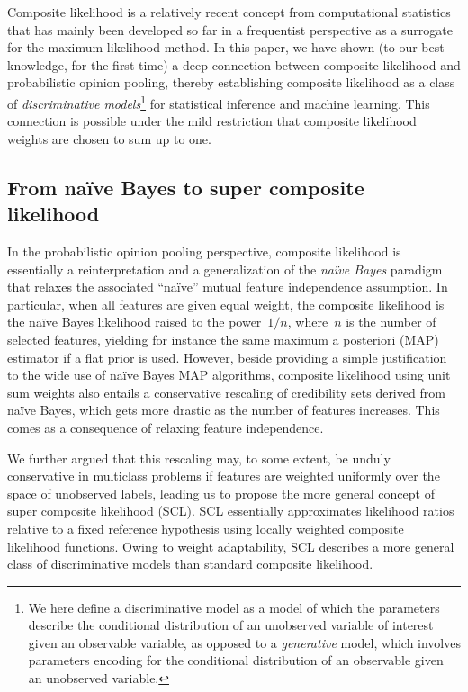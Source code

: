 \documentclass[english]{scrartcl}
\begin{document}
Composite likelihood is a relatively recent concept from computational statistics that has mainly been developed so far in a frequentist perspective as a surrogate for the maximum likelihood method. In this paper, we have shown (to our best knowledge, for the first time) a deep connection between composite likelihood and  probabilistic opinion pooling, thereby establishing composite likelihood as a class of {\em discriminative models}\footnote{We here define a discriminative model as a model of which the parameters describe the conditional distribution of an unobserved variable of interest given an observable variable, as opposed to a {\em generative} model, which involves parameters encoding for the conditional distribution of an observable given an unobserved variable.} for statistical inference and machine learning. This connection is possible under the mild restriction that composite likelihood weights are chosen to sum up to one.

\subsection{From na\"ive Bayes to super composite likelihood}

In the probabilistic opinion pooling perspective, composite likelihood is essentially a reinterpretation and a generalization of the {\em na\"ive Bayes} paradigm that relaxes the associated ``na\"ive'' mutual feature independence assumption. In particular, when all features are given equal weight, the composite likelihood is the na\"ive Bayes likelihood raised to the power~$1/n$, where~$n$ is the number of selected features, yielding for instance the same maximum a posteriori (MAP) estimator if a flat prior is used. However, beside providing a simple justification to the wide use of na\"ive Bayes MAP algorithms,  composite likelihood using unit sum weights also entails a conservative rescaling of credibility sets derived from na\"ive Bayes, which gets more drastic as the number of features increases. This comes as a consequence of relaxing feature independence.

We further argued that this rescaling may, to some extent, be unduly conservative in multiclass problems if features are weighted uniformly over the space of unobserved labels, leading us to propose the more general concept of super composite likelihood (SCL). SCL essentially approximates likelihood ratios relative to a fixed reference hypothesis using locally weighted composite likelihood functions. Owing to weight adaptability, SCL describes a more general class of discriminative models than standard composite likelihood. 
\end{document}
